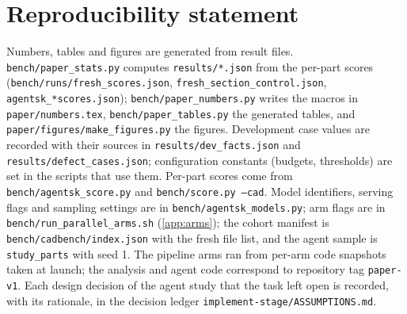 \section*{Reproducibility statement}
Numbers, tables and figures are generated from result files. \texttt{bench/paper\_stats.py} computes \texttt{results/*.json} from the per-part scores (\texttt{bench/runs/fresh\_scores.json}, \texttt{fresh\_section\_control.json}, \texttt{agentsk\_*scores.json}); \texttt{bench/paper\_numbers.py} writes the macros in \texttt{paper/numbers.tex}, \texttt{bench/paper\_tables.py} the generated tables, and \texttt{paper/figures/make\_figures.py} the figures. Development case values are recorded with their sources in \texttt{results/dev\_facts.json} and \texttt{results/defect\_cases.json}; configuration constants (budgets, thresholds) are set in the scripts that use them. Per-part scores come from \texttt{bench/agentsk\_score.py} and \texttt{bench/score.py --cad}. Model identifiers, serving flags and sampling settings are in \texttt{bench/agentsk\_models.py}; arm flags are in \texttt{bench/run\_parallel\_arms.sh} (\cref{app:arms}); the cohort manifest is \texttt{bench/cadbench/index.json} with the fresh file list, and the agent sample is \texttt{study\_parts} with seed 1. The pipeline arms ran from per-arm code snapshots taken at launch; the analysis and agent code correspond to repository tag \texttt{paper-v1}. Each design decision of the agent study that the task left open is recorded, with its rationale, in the decision ledger \texttt{implement-stage/ASSUMPTIONS.md}.
